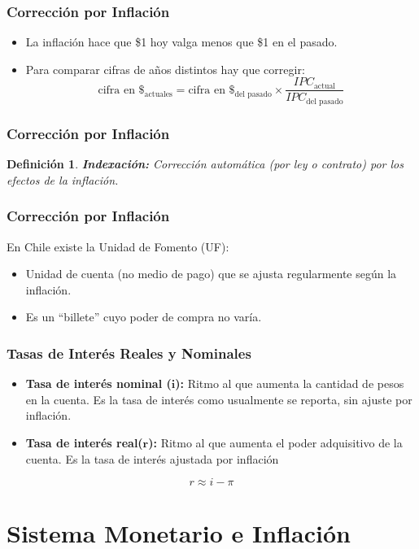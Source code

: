 \documentclass[dvipsnames,table,leqno]{beamer}
\newtheorem{mydef}{Definición}
\newcommand{\peq}[1]{{\scriptscriptstyle{#1}}}
\begin{document}
		\begin{frame}
			\frametitle{Corrección por Inflación}
				\begin{itemize}
					\item La inflación hace que \$1 hoy valga menos que \$1 en el pasado.
					\item Para comparar cifras de años distintos hay que corregir: $$\text{cifra en } \$_\peq{\text{actuales}}=\text{cifra en } \$_\peq{\text{del pasado}}\times\frac{IPC_\peq{\text{actual}}}{IPC_\peq{\text{del pasado}}}$$
				\end{itemize}
		\end{frame}	

		\begin{frame}
			\frametitle{Corrección por Inflación}
				\begin{mydef}
					\textbf{Indexación:} Corrección automática (por ley o contrato) por los efectos de la inflación.
				\end{mydef}
		\end{frame}	

		\begin{frame}
			\frametitle{Corrección por Inflación}
			En Chile existe la Unidad de Fomento (UF):
			\begin{itemize}
				\item Unidad de cuenta (no medio de pago) que se ajusta regularmente según la inflación.
				\item Es un ``billete'' cuyo poder de compra no varía.
			\end{itemize}
		\end{frame}	

		\begin{frame}
			\frametitle{Tasas de Interés Reales y Nominales}
			\begin{itemize}
				\item \textbf{Tasa de interés nominal ($\mathbf{i}$):} Ritmo al que aumenta la cantidad de pesos en la cuenta. Es la tasa de interés como usualmente se reporta, sin ajuste por inflación.
				\item \textbf{Tasa de interés real($\mathbf{r}$):} Ritmo al que aumenta el poder adquisitivo de la cuenta. Es la tasa de interés ajustada por inflación
			\end{itemize}
			$$r\approx i-\pi$$
		\end{frame}	

	\section{Sistema Monetario e Inflación}
\end{document}
